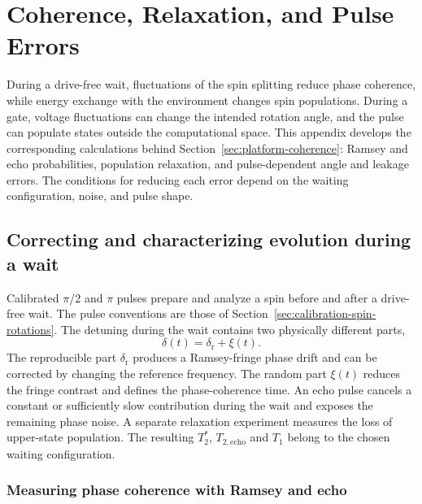 \FloatBarrier
\section{Coherence, Relaxation, and Pulse Errors}
\label{app:noise-leakage}

\label{sec:noise-leakage-robust-control}

During a drive-free wait, fluctuations of the spin splitting reduce
phase coherence, while energy exchange with the environment changes
spin populations. During a gate, voltage fluctuations can change the
intended rotation angle, and the pulse can populate states outside
the computational space. This appendix develops the corresponding
calculations behind Section~\ref{sec:platform-coherence}: Ramsey and
echo probabilities, population relaxation, and pulse-dependent angle
and leakage errors. The conditions for reducing each error depend on
the waiting configuration, noise, and pulse shape.

\subsection{Correcting and characterizing evolution during a wait}
\label{sec:idle-single-spin-characterization}

Calibrated $\pi/2$ and $\pi$ pulses prepare and analyze a spin
before and after a drive-free wait. The pulse conventions are those
of Section~\ref{sec:calibration-spin-rotations}. The detuning during the wait contains two physically different
parts,
\[
 \delta(t)=\delta_{\mathrm r}+\xi(t).
\]
The reproducible part $\delta_{\mathrm r}$ produces a Ramsey-fringe
phase drift and can be corrected by changing the reference frequency.
The random part $\xi(t)$ reduces the fringe contrast and defines the
phase-coherence time. An echo pulse cancels a constant or sufficiently
slow contribution during the wait and exposes the remaining phase
noise. A separate relaxation experiment measures the loss of
upper-state population. The resulting $T_2^*$, $T_{2,\mathrm{echo}}$
and $T_1$ belong to the chosen waiting configuration.

\subsubsection{Measuring phase coherence with Ramsey and echo}
\label{sec:measurement-free-spin-dynamics}
\label{sec:measurement-ramsey-echo}

